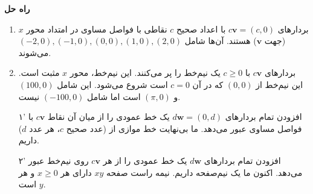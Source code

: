 \documentclass[12pt, a4paper]{book}
\begin{document}
	\textbf{راه حل}
	\begin{enumerate}
		\item بردارهای $c\mathbf{v} = (c,0)$ با اعداد صحیح $c$ نقاطی با فواصل مساوی در امتداد محور $x$ (جهت $\mathbf{v}$) هستند. آن‌ها شامل $(-2,0), (-1,0), (0,0), (1,0), (2,0)$ می‌شوند.
		\item بردارهای $c\mathbf{v}$ با $c \ge 0$ یک نیم‌خط را پر می‌کنند. این نیم‌خط، محور $x$ مثبت است. این نیم‌خط از $(0,0)$ که در آن $c=0$ است شروع می‌شود. این شامل $(100,0)$ و $(\pi, 0)$ است اما شامل $(-100,0)$ نیست.
	\end{enumerate}
	\begin{enumerate}
		\item[۱'] افزودن تمام بردارهای $d\mathbf{w} = (0,d)$ یک خط عمودی را از میان آن نقاط $c\mathbf{v}$ با فواصل مساوی عبور می‌دهد. ما بی‌نهایت خط موازی از (عدد صحیح $c$، هر عدد $d$) داریم.
		\item[۲'] افزودن تمام بردارهای $d\mathbf{w}$ یک خط عمودی را از هر $c\mathbf{v}$ روی نیم‌خط عبور می‌دهد. اکنون ما یک نیم‌صفحه داریم. نیمه راست صفحه $xy$ دارای هر $x \ge 0$ و هر $y$ است.
	\end{enumerate}
	
\end{document}
